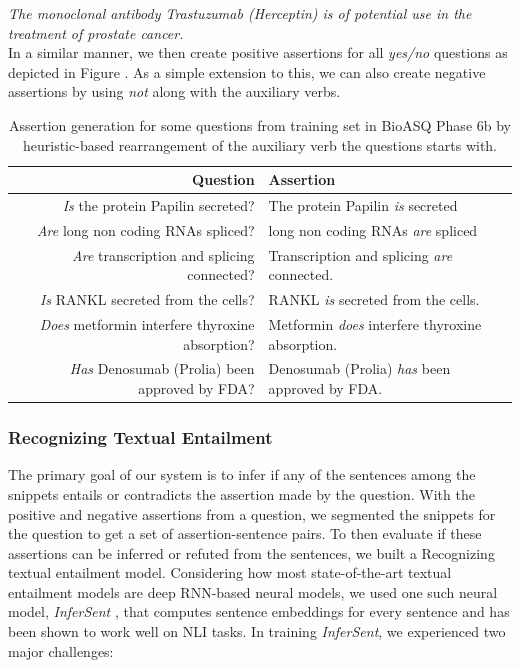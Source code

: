 \documentclass[11pt,a4paper]{article}
\begin{document}
\textit{The monoclonal antibody Trastuzumab (Herceptin) is of potential use in the treatment of prostate cancer.} \\

In a similar manner, we then create positive assertions for all \textit{yes/no} questions as depicted in Figure . As a simple extension to this, we can also create negative assertions by using \textit{not} along with the auxiliary verbs.

\begin{table}[t!]
    \centering
    \begin{tabular}{r l} \hline
        Question & Assertion \\ \hline
    \textit{Is} the protein Papilin secreted? & The protein Papilin \textit{is} secreted \\
    \textit{Are} long non coding RNAs spliced? & 
    long non coding RNAs \textit{are} spliced \\
    \textit{Are} transcription and splicing connected? &
    Transcription and splicing \textit{are} connected. \\
    \textit{Is} RANKL secreted from the cells? &
    RANKL \textit{is} secreted from the cells. \\
    \textit{Does} metformin interfere thyroxine absorption? & 
    Metformin \textit{does} interfere thyroxine absorption. \\
    \textit{Has} Denosumab (Prolia) been approved by FDA? &
    Denosumab (Prolia) \textit{has} been approved by FDA. \\
    \hline
   \end{tabular}
    \caption{Assertion generation for some questions from training set in BioASQ Phase 6b by heuristic-based rearrangement of the auxiliary verb the questions starts with.}    \label{tab:assertion_examples}
\end{table}

\subsubsection{Recognizing Textual Entailment}

The primary goal of our system is to infer if any of the sentences among the snippets entails or contradicts the assertion made by the question. With the positive and negative assertions from a question, we segmented the snippets for the question to get a set of assertion-sentence pairs. To then evaluate if these assertions can be inferred or refuted from the sentences, we built a Recognizing textual entailment model. Considering how most state-of-the-art textual entailment models are deep RNN-based neural models, we used one such neural model, \textit{InferSent} \cite{Infersent} , that computes sentence embeddings for every sentence and has been shown to work well on NLI tasks. In training \textit{InferSent}, we experienced two major challenges:
\end{document}
